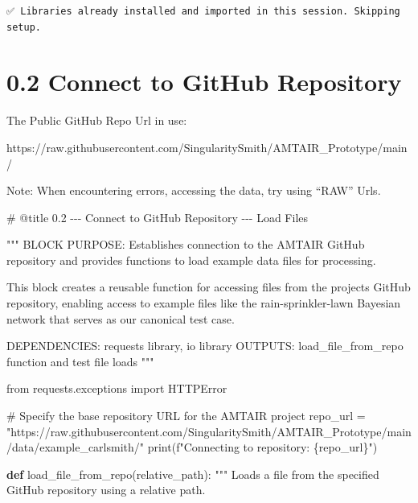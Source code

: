 \documentclass[
  11pt,
  letterpaper,
]{book}
\newenvironment{Shaded}{\begin{snugshade}}{\end{snugshade}}
\newcommand{\BuiltInTok}[1]{\textcolor[rgb]{0.00,0.23,0.31}{#1}}
\newcommand{\CommentTok}[1]{\textcolor[rgb]{0.37,0.37,0.37}{#1}}
\newcommand{\ImportTok}[1]{\textcolor[rgb]{0.00,0.46,0.62}{#1}}
\newcommand{\KeywordTok}[1]{\textcolor[rgb]{0.00,0.23,0.31}{\textbf{#1}}}
\newcommand{\NormalTok}[1]{\textcolor[rgb]{0.00,0.23,0.31}{#1}}
\newcommand{\OperatorTok}[1]{\textcolor[rgb]{0.37,0.37,0.37}{#1}}
\newcommand{\SpecialCharTok}[1]{\textcolor[rgb]{0.37,0.37,0.37}{#1}}
\newcommand{\SpecialStringTok}[1]{\textcolor[rgb]{0.13,0.47,0.30}{#1}}
\newcommand{\StringTok}[1]{\textcolor[rgb]{0.13,0.47,0.30}{#1}}
\begin{document}
\begin{verbatim}
✅ Libraries already installed and imported in this session. Skipping setup.
\end{verbatim}

\section{0.2 Connect to GitHub
Repository}\label{connect-to-github-repository}

The Public GitHub Repo Url in use:

https://raw.githubusercontent.com/SingularitySmith/AMTAIR\_Prototype/main/

Note: When encountering errors, accessing the data, try using ``RAW''
Urls.

\label{my_code_cell_test}
\begin{Shaded}
\begin{Highlighting}[]
\CommentTok{\# @title 0.2 {-}{-}{-} Connect to GitHub Repository {-}{-}{-} Load Files}

\CommentTok{"""}
\CommentTok{BLOCK PURPOSE: Establishes connection to the AMTAIR GitHub repository and provides}
\CommentTok{functions to load example data files for processing.}

\CommentTok{This block creates a reusable function for accessing files from the project\textquotesingle{}s}
\CommentTok{GitHub repository, enabling access to example files like the rain{-}sprinkler{-}lawn}
\CommentTok{Bayesian network that serves as our canonical test case.}

\CommentTok{DEPENDENCIES: requests library, io library}
\CommentTok{OUTPUTS: load\_file\_from\_repo function and test file loads}
\CommentTok{"""}

\ImportTok{from}\NormalTok{ requests.exceptions }\ImportTok{import}\NormalTok{ HTTPError}

\CommentTok{\# Specify the base repository URL for the AMTAIR project}
\NormalTok{repo\_url }\OperatorTok{=} \StringTok{"https://raw.githubusercontent.com/SingularitySmith/AMTAIR\_Prototype/main/data/example\_carlsmith/"}
\BuiltInTok{print}\NormalTok{(}\SpecialStringTok{f"Connecting to repository: }\SpecialCharTok{\{}\NormalTok{repo\_url}\SpecialCharTok{\}}\SpecialStringTok{"}\NormalTok{)}

\KeywordTok{def}\NormalTok{ load\_file\_from\_repo(relative\_path):}
    \CommentTok{"""}
\CommentTok{    Loads a file from the specified GitHub repository using a relative path.}


\end{Highlighting}
\end{Shaded}
\end{document}
